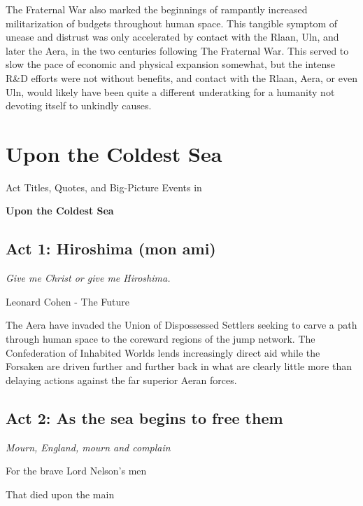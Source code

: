 The Fraternal War also marked the beginnings of rampantly increased
militarization of budgets throughout human space. This tangible
symptom of unease and distrust was only accelerated by contact with
the Rlaan, Uln, and later the Aera, in the two centuries following The
Fraternal War. This served to slow the pace of economic and physical
expansion somewhat, but the intense R\&D efforts were not without
benefits, and contact with the Rlaan, Aera, or even Uln, would likely
have been quite a different underatking for a humanity not devoting
itself to unkindly causes.

\section{Upon the Coldest Sea}
\label{exptimeline:UtCS}
Act Titles, Quotes, and Big-Picture Events in

{\bf Upon the Coldest Sea }

\subsection{Act 1: Hiroshima (mon ami)}
\begin{center}
{\it Give me Christ or give me Hiroshima.}

Leonard Cohen - The Future
\end{center}

The Aera have invaded the Union of Dispossessed Settlers seeking to
carve a path through human space to the coreward regions of the jump
network. The Confederation of Inhabited Worlds lends increasingly
direct aid while the Forsaken are driven further and further back in
what are clearly little more than delaying actions against the far
superior Aeran forces.

\subsection{Act 2: As the sea begins to free them}

\begin{center}
{\it Mourn, England, mourn and complain

For the brave Lord Nelson's men

That died upon the main}
\end{center}


